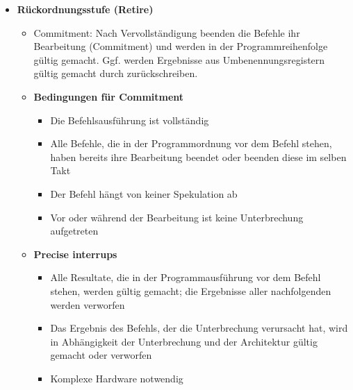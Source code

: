 \begin{itemize}
\begin{itemize}
				\end{itemize}
				\item \textbf{Rückordnungsstufe (Retire)}
				\begin{itemize}
					\item Commitment: Nach Vervollständigung beenden die Befehle ihr Bearbeitung (Commitment) und werden in der Programmreihenfolge gültig gemacht. Ggf. werden Ergebnisse aus Umbenennungsregistern gültig gemacht durch zurückschreiben. 
					\item \textbf{Bedingungen für Commitment}
					\begin{itemize}
						\item Die Befehlsausführung ist vollständig
						\item Alle Befehle, die in der Programmordnung vor dem Befehl stehen, haben bereits ihre Bearbeitung beendet oder beenden diese im selben Takt
						\item Der Befehl hängt von keiner Spekulation ab
						\item Vor oder während der Bearbeitung ist keine Unterbrechung aufgetreten
					\end{itemize}
					\item \textbf{Precise interrups}
					\begin{itemize}
						\item Alle Resultate, die in der Programmausführung vor dem Befehl stehen, werden gültig gemacht; die Ergebnisse aller nachfolgenden werden verworfen
						\item Das Ergebnis des Befehls, der die Unterbrechung verursacht hat, wird in Abhängigkeit der Unterbrechung und der Architektur gültig gemacht oder verworfen
						\item Komplexe Hardware notwendig
					\end{itemize}
				\end{itemize}
			\end{itemize}

